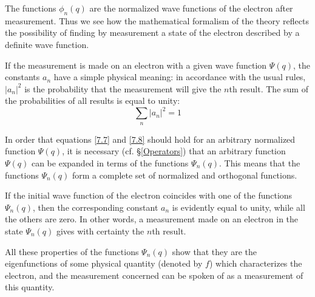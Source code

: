 The functions $ \phi_n(q) $ are the normalized wave functions of the electron after measurement. Thus we see how the mathematical formalism of the theory reflects the possibility of finding by measurement a state of the electron described by a definite wave function.
		
If the measurement is made on an electron with a given wave function $ \Psi(q) $, the constants $ a_n $ have a simple physical meaning: in accordance with the usual rules, $ |a_n|^2 $ is the probability that the measurement will give the $ n $th result. The sum of the probabilities of all results is equal to unity:
\begin{equation}\label{7.8}
\sum_{n}|a_n|^2=1
\end{equation}		

In order that equations \eqref{7.7} and \eqref{7.8} should hold for an arbitrary normalized function $ \Psi(q) $, it is necessary (cf. §\ref{Operators}) that an arbitrary function $ \Psi(q) $ can be expanded in terms of the functions $ \Psi_n(q) $. This means that the functions $ \Psi_n(q) $ form a complete set of normalized and orthogonal functions.
		
If the initial wave function of the electron coincides with one of the functions $ \Psi_n(q) $, then the corresponding constant $ a_n $ is evidently equal to unity, while all the others are zero. In other words, a measurement made on an electron in the state $ \Psi_n(q) $ gives with certainty the $ n $th result.
		
All these properties of the functions $ \Psi_n(q) $ show that they are the eigenfunctions of some physical quantity (denoted by $ f $) which characterizes the electron, and the measurement concerned can be spoken of as a measurement of this quantity.
		
